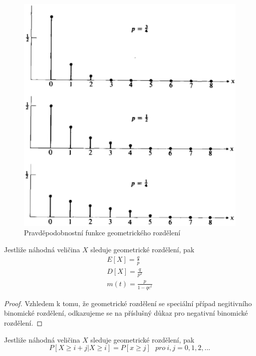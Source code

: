 \begin{figure}[htp]
\centering
\includegraphics[scale = 0.3]{pictures/geometric_distribution.eps}
\caption{Pravděpodobnostní funkce geometrického rozdělení}
\label{geometric_distribution}
\end{figure}

\begin{theorem}
Jestliže náhodná veličina $X$ sleduje geometrické rozdělení, pak
\begin{gather*}
E[X] = \frac{q}{p}\\
D[X] = \frac{q}{p^2}\\
m(t) = \frac{p}{1 - qe^t}
\end{gather*}
\end{theorem}

\begin{proof}
Vzhledem k tomu, že geometrické rozdělení se speciální případ negitivního binomické rozdělení, odkazujeme se na příslušný důkaz pro negativní binomické rozdělení.
\end{proof}

\begin{theorem}
Jestliže náhodná veličina $X$ sleduje geometrické rozdělení, pak
\begin{equation*}
P[X \ge i + j | X \ge i] = P[x \ge j]~~~\textit{pro}~i,j = 0,1,2,...
\end{equation*}
\end{theorem}

